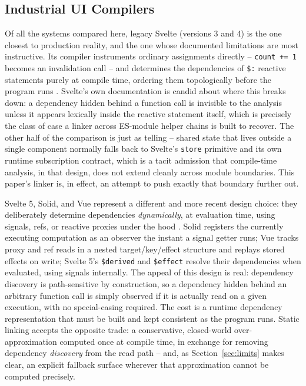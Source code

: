 \documentclass[conference]{IEEEtran}
\begin{document}
\subsection{Industrial UI Compilers}

Of all the systems compared here, legacy Svelte (versions 3 and 4) is the
one closest to production reality, and the one whose documented limitations
are most instructive. Its compiler instruments ordinary assignments directly
-- \texttt{count += 1} becomes an invalidation call -- and determines the
dependencies of \texttt{\$:} reactive statements purely at compile time,
ordering them topologically before the program runs \cite{svelte3,svelte-legacy}.
Svelte's own documentation is candid about where this breaks down: a
dependency hidden behind a function call is invisible to the analysis unless
it appears lexically inside the reactive statement itself, which is precisely
the class of case a linker across ES-module helper chains is built to
recover. The other half of the comparison is just as telling -- shared state
that lives outside a single component normally falls back to Svelte's
\texttt{store} primitive and its own runtime subscription contract, which is
a tacit admission that compile-time analysis, in that design, does not extend
cleanly across module boundaries. This paper's linker is, in effect, an
attempt to push exactly that boundary further out.

Svelte 5, Solid, and Vue represent a different and more recent design choice:
they deliberately determine dependencies \emph{dynamically}, at evaluation
time, using signals, refs, or reactive proxies under the hood
\cite{svelte-runes,solid-reactivity,vue-reactivity}. Solid registers the
currently executing computation as an observer the instant a signal getter
runs; Vue tracks proxy and ref reads in a nested target/key/effect structure
and replays stored effects on write; Svelte 5's \texttt{\$derived} and
\texttt{\$effect} resolve their dependencies when evaluated, using signals
internally. The appeal of this design is real: dependency discovery is
path-sensitive by construction, so a dependency hidden behind an arbitrary
function call is simply observed if it is actually read on a given execution,
with no special-casing required. The cost is a runtime dependency
representation that must be built and kept consistent as the program runs.
Static linking accepts the opposite trade: a conservative, closed-world
over-approximation computed once at compile time, in exchange for removing
dependency \emph{discovery} from the read path -- and, as
Section~\ref{sec:limits} makes clear, an explicit fallback surface wherever
that approximation cannot be computed precisely.
\end{document}
